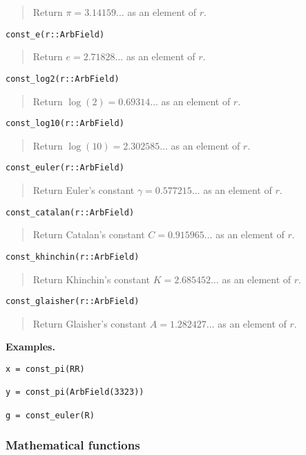 \documentclass[a4paper,10pt]{article}
\newcommand{\desc}[1]{\vspace{-3mm}\begin{quote}#1\end{quote}}
\begin{document}
{{\desc{Return $\pi = 3.14159\ldots$ as an element of $r$.}

\begin{lstlisting}
const_e(r::ArbField)
\end{lstlisting}

\desc{Return $e = 2.71828\ldots$ as an element of $r$.}

\begin{lstlisting}
const_log2(r::ArbField)
\end{lstlisting}

\desc{Return $\log(2) = 0.69314\ldots$ as an element of $r$.}

\begin{lstlisting}
const_log10(r::ArbField)
\end{lstlisting}

\desc{Return $\log(10) = 2.302585\ldots$ as an element of $r$.}

\begin{lstlisting}
const_euler(r::ArbField)
\end{lstlisting}

\desc{Return Euler's constant $\gamma = 0.577215\ldots$ as an element of $r$.}

\begin{lstlisting}
const_catalan(r::ArbField)
\end{lstlisting}

\desc{Return Catalan's constant $C = 0.915965\ldots$ as an element of $r$.}

\begin{lstlisting}
const_khinchin(r::ArbField)
\end{lstlisting}

\desc{Return Khinchin's constant $K = 2.685452\ldots$ as an element of $r$.}

\begin{lstlisting}
const_glaisher(r::ArbField)
\end{lstlisting}

\desc{Return Glaisher's constant $A = 1.282427\ldots$ as an element of $r$.}

\textbf{Examples.}

\begin{lstlisting}
x = const_pi(RR)

y = const_pi(ArbField(3323))

g = const_euler(R)
\end{lstlisting}

\subsubsection{Mathematical functions}

}}
\end{document}
